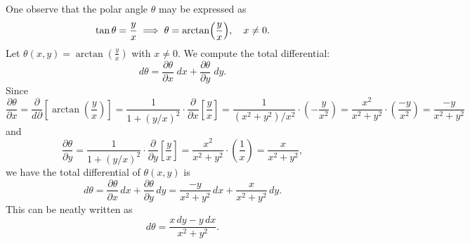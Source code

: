 \documentclass[11pt,openany]{article}
\begin{document}
One observe that the polar angle \(\theta\) may be expressed as \[
\tan\theta=\frac{y}{x}\implies\theta = \arctan\Bigl(\frac{y}{x}\Bigr),\quad x\neq 0.
\] Let $\displaystyle\theta(x,y)=\arctan\left(\frac{y}{x}\right)$ with $x\neq 0$. We compute the total differential: \[
d\theta = \frac{\partial\theta}{\partial x}\; dx + \frac{\partial\theta}{\partial y}\; dy.
\] Since \[
\frac{\partial\theta}{\partial x} = \frac{\partial}{d\partial}\left[\arctan\left(\frac{y}{x}\right)\right] = \frac{1}{1+(y/x)^2}\cdot \frac{\partial}{\partial x}\left[\frac{y}{x}\right]=\frac{1}{(x^2+y^2)/x^2}\cdot \left(-\frac{y}{x^2}\right)=\frac{x^2}{x^2+y^2}\cdot\left(\frac{-y}{x^2}\right)=\frac{-y}{x^2+y^2}
\] and \[
\frac{\partial\theta}{\partial y} = \frac{1}{1+(y/x)^2}\cdot \frac{\partial}{\partial y}\left[\frac{y}{x}\right]=\frac{x^2}{x^2+y^2}\cdot\left(\frac{1}{x}\right)=\frac{x}{x^2+y^2},
\] we have the total differential of \(\theta(x,y)\) is
\[
d\theta = \frac{\partial\theta}{\partial x}\,dx + \frac{\partial\theta}{\partial y}\,dy
= \frac{-y}{x^2+y^2}\,dx + \frac{x}{x^2+y^2}\,dy.
\] This can be neatly written as\[
\boxed{d\theta = \frac{x\,dy - y\,dx}{x^2+y^2}.}
\]
\end{document}
